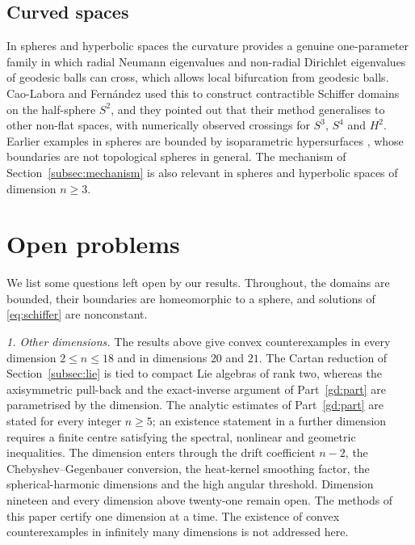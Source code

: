 \documentclass[11pt]{amsart}
\newcommand{\topdim}{18}
\theoremstyle{definition}
\theoremstyle{remark}
\numberwithin{equation}{section}
\begin{document}
\subsection{Curved spaces}
In spheres and hyperbolic spaces the curvature provides a genuine one-parameter family in which radial Neumann eigenvalues and non-radial Dirichlet eigenvalues of geodesic balls can cross, which allows local bifurcation from geodesic balls. Cao-Labora and Fern\'andez \cite{CLF25} used this to construct contractible Schiffer domains on the half-sphere $S^2$, and they pointed out \cite[Remark~1.2]{CLF25} that their method generalises to other non-flat spaces, with numerically observed crossings for $S^3$, $S^4$ and $H^2$. Earlier examples in spheres are bounded by isoparametric hypersurfaces \cite{Shk00,PS21}, whose boundaries are not topological spheres in general. The mechanism of Section~\ref{subsec:mechanism} is also relevant in spheres and hyperbolic spaces of dimension $n\geq3$.



\section{Open problems}\label{sec:open}

We list some questions left open by our results. Throughout, the domains are bounded, their boundaries are homeomorphic to a sphere, and solutions of \eqref{eq:schiffer} are nonconstant.

\emph{1. Other dimensions.}
The results above give convex counterexamples in every dimension $2\le n\le\topdim$ and in dimensions $20$ and $21$.
The Cartan reduction of Section~\ref{subsec:lie} is tied to compact Lie algebras of rank two, whereas the axisymmetric pull-back and the exact-inverse argument of Part~\ref{gd:part} are parametrised by the dimension.
The analytic estimates of Part~\ref{gd:part} are stated for every integer $n\ge5$; an existence statement in a further dimension requires a finite centre satisfying the spectral, nonlinear and geometric inequalities.
The dimension enters through the drift coefficient $n-2$, the Chebyshev--Gegenbauer conversion, the heat-kernel smoothing factor, the spherical-harmonic dimensions and the high angular threshold.
Dimension nineteen and every dimension above twenty-one remain open.
The methods of this paper certify one dimension at a time. The existence of convex counterexamples in infinitely many dimensions is not addressed here.
\end{document}
